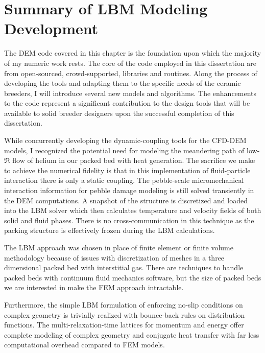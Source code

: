 %
%
\section{Summary of LBM Modeling Development}


The DEM code covered in this chapter is the foundation upon which the majority of my numeric work rests. The core of the code employed in this dissertation are from open-sourced, crowd-supported, libraries and routines. Along the process of developing the tools and adapting them to the specific needs of the ceramic breeders, I will introduce several new models and algorithms. The enhancements to the code represent a significant contribution to the design tools that will be available to solid breeder designers upon the successful completion of this dissertation.

While concurrently developing the dynamic-coupling tools for the CFD-DEM models, I recognized the potential need for modeling the meandering path of low-$\Re$ flow of helium in our packed bed with heat generation. The sacrifice we make to achieve the numerical fidelity is that in this implementation of fluid-particle interaction there is only a static coupling. The pebble-scale micromechanical interaction information for pebble damage modeling is still solved transiently in the DEM computations. A snapshot of the structure is discretized and loaded into the LBM solver which then calculates temperature and velocity fields of both solid and fluid phases. There is no cross-communication in this technique as the packing structure is effectively frozen during the LBM calculations.

The LBM approach was chosen in place of finite element or finite volume methodology because of issues with discretization of meshes in a three dimensional packed bed with interstitial gas. There are techniques to handle packed beds with continuum fluid mechanics software, but the size of packed beds we are interested in make the FEM approach intractable.

Furthermore, the simple LBM formulation of enforcing no-slip conditions on complex geometry is trivially realized with bounce-back rules on distribution functions. The multi-relaxation-time lattices for momentum and energy offer complete modeling of complex geometry and conjugate heat transfer with far less computational overhead compared to FEM models.